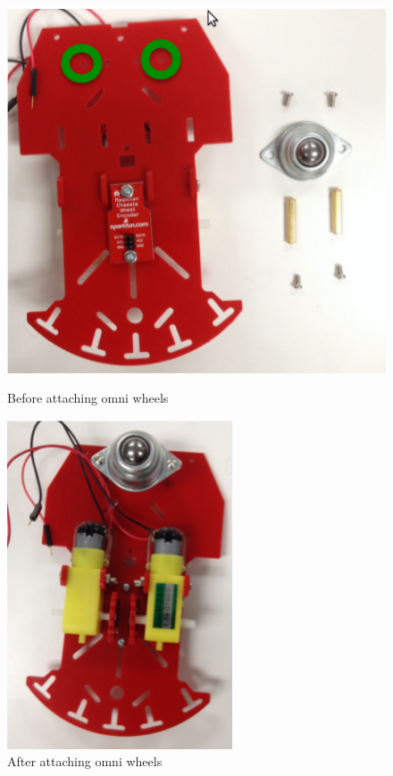 \begin{figure}[h]
\centering
\includegraphics[width=0.4\columnwidth]{Images/Assembly/3a}
\caption{ Before attaching omni wheels }
\vspace{2mm}
\includegraphics[width=0.4\columnwidth]{Images/Assembly/3b}
\caption{ After attaching omni wheels }
\label{fig:omni_wheels}
\end{figure}

